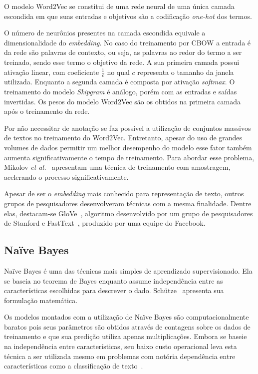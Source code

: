 O modelo Word2Vec se constitui de uma rede neural de uma única camada escondida em que suas entradas e objetivos são a
codificação \textit{one-hot} dos termos.

O número de neurônios presentes na camada escondida equivale a dimensionalidade do \textit{embedding}.
No caso do treinamento por CBOW a entrada é da rede são palavras de contexto, ou seja, as palavras ao redor do termo a
ser treinado, sendo esse termo o objetivo da rede.
A sua primeira camada possui ativação linear, com coeficiente $\frac{1}{c}$ no qual $c$ representa o tamanho da janela
utilizada.
Enquanto a segunda camada é composta por ativação \textit{softmax}.
O treinamento do modelo \textit{Skipgram} é análogo, porém com as entradas e saídas invertidas.
Os pesos do modelo Word2Vec são os obtidos na primeira camada após o treinamento da rede.

Por não necessitar de anotação se faz possível a utilização de conjuntos massivos de textos no treinamento do Word2Vec.
Entretanto, apesar do uso de grandes volumes de dados permitir um melhor desempenho do modelo esse fator também aumenta
significativamente o tempo de treinamento.
Para abordar esse problema, Mikolov \textit{et al.}~\cite{mikolov13b} apresentam uma técnica de treinamento com
amostragem, acelerando o processo significativamente.

Apesar de ser o \textit{embedding} mais conhecido para representação de texto, outros grupos de pesquisadores
desenvolveram técnicas com a mesma finalidade.
Dentre elas, destacam-se GloVe~\cite{pennington14}, algoritmo desenvolvido por um grupo de pesquisadores de Stanford e
FastText~\cite{bojanowski16}, produzido por uma equipe do Facebook.

\subsection{Naïve Bayes}

Naïve Bayes é uma das técnicas mais simples de aprendizado supervisionado.
Ela se baseia no teorema de Bayes enquanto assume independência entre as características escolhidas para descrever o dado.
Schütze~\cite{schutze08} apresenta sua formulação matemática.

Os modelos montados com a utilização de Naïve Bayes são computacionalmente baratos pois seus parâmetros são obtidos
através de contagens sobre os dados de treinamento e que sua predição utiliza apenas multiplicações.
Embora se baseie na independência entre características, seu baixo custo operacional leva esta técnica a ser utilizada
mesmo em problemas com notória dependência entre características como a classificação de texto~\cite{mccallum98}.

